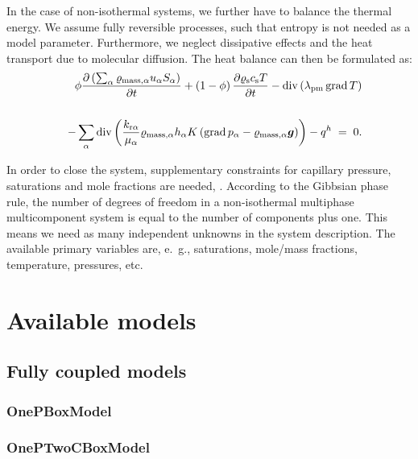 In the case of non-isothermal systems, we further have to balance the
thermal energy. We assume fully reversible processes, such that entropy
is not needed as a model parameter. Furthermore, we neglect 
dissipative effects and the heat transport due to molecular
diffusion. The heat balance can then be
formulated as:
%
\begin{eqnarray}
  \label{A3:eqenergmak1}
  && \phi \frac{\partial \left( \sum_\alpha \varrho_{\text{mass},
        \alpha} u_\alpha S_\alpha \right)}{\partial t} + \left( 1 -
    \phi \right) \frac{\partial \varrho_{\text{s}} c_{\text{s}}
    T}{\partial t} \nonumber 
 - \operatorname{div} \left( \lambda_{\text{pm}} \operatorname{grad} T \right)
  \nonumber \\
  \nonumber \\
  && - \sum\limits_\alpha \operatorname{div} \left( \frac{k_{\text{r}
        \alpha}}{\mu_\alpha} \varrho_{\text{mass}, \alpha} h_\alpha
    K \left( \operatorname{grad} p_\alpha - \varrho_{\text{mass}, \alpha}
      \boldsymbol{g} \right) \right) \nonumber 
 - q^h \; = \; 0.
\end{eqnarray}

In order to close the system, supplementary constraints for capillary pressure, saturations and mole
fractions are needed, \cite{A3:helmig:1997}. 
According to the Gibbsian phase rule, the number of degrees of freedom
in a non-isothermal multiphase multicomponent system is equal to the
number of components plus one. This means we need as many independent
unknowns in the system description. The
available primary variables are, e.\ g., saturations, mole/mass
fractions, temperature, pressures, etc.




\section{Available models} 

\subsection{Fully coupled models} 

\subsubsection{OnePBoxModel} 


\subsubsection{OnePTwoCBoxModel} 


